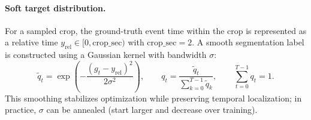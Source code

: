 \documentclass[12pt]{article}
\begin{document}
\paragraph{Soft target distribution.}
For a sampled crop, the ground-truth event time within the crop is represented as a relative time
$y_{\mathrm{rel}}\in[0,\mathrm{crop\_sec})$ with $\mathrm{crop\_sec}=2$.
A smooth segmentation label is constructed using a Gaussian kernel with bandwidth $\sigma$:
\begin{equation}
\label{eq:rt_soft_target}
\tilde q_t=\exp\left(-\frac{(g_t-y_{\mathrm{rel}})^2}{2\sigma^2}\right),\qquad
q_t=\frac{\tilde q_t}{\sum_{k=0}^{T-1}\tilde q_k},\qquad
\sum_{t=0}^{T-1} q_t=1.
\end{equation}
This smoothing stabilizes optimization while preserving temporal localization; in practice, $\sigma$ can be annealed
(start larger and decrease over training).
\end{document}
